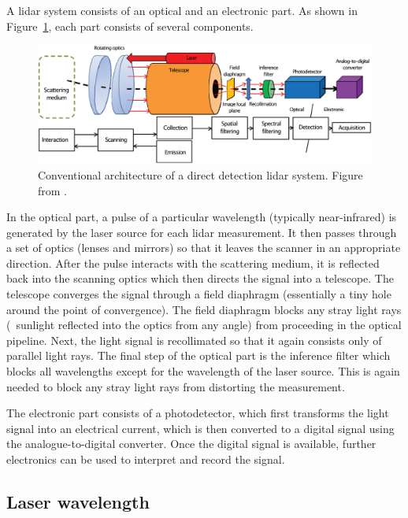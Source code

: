 A lidar system consists of an optical and an electronic part. 
As shown in Figure~\ref{fig:lidar-components}, each part consists of several components.
\begin{figure}
	\centering
	\includegraphics[width=\textwidth]{figs/lidar-components.png}
	\caption{Conventional architecture of a direct detection lidar system. Figure from \citet{Chazette16}.}%
\label{fig:lidar-components}
\end{figure}

In the optical part, a pulse of a particular wavelength (typically near-infrared) is generated by the laser source for each lidar measurement. 
It then passes through a set of  optics (lenses and mirrors) so that it leaves the scanner in an appropriate direction. 
After the pulse interacts with the scattering medium, it is reflected back into the scanning optics which then directs the signal into a telescope. 
The telescope converges the signal through a field diaphragm (essentially a tiny hole around the point of convergence). 
The field diaphragm blocks any stray light rays (\eg\ sunlight reflected into the optics from any angle) from proceeding in the optical pipeline. 
Next, the light signal is recollimated so that it again consists only of parallel light rays. 
The final step of the optical part is the inference filter which blocks all wavelengths except for the wavelength of the laser source. 
This is again needed to block any stray light rays from distorting the measurement.

The electronic part consists of a photodetector, which first transforms the light signal into an electrical current, which is then converted to a digital signal using the analogue-to-digital converter. 
Once the digital signal is available, further electronics can be used to interpret and record the signal.


\subsection{Laser wavelength}

